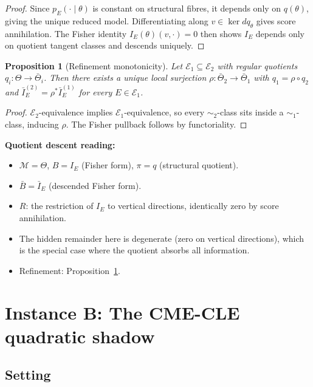 \documentclass[11pt,a4paper]{article}
\numberwithin{equation}{section}
\theoremstyle{thmcompact}
\newtheorem{proposition}[theorem]{Proposition}
\theoremstyle{remark}
\begin{document}
\begin{proof}
Since $p_E(\cdot \mid \theta)$ is constant on structural fibres, it depends only on $q(\theta)$, giving the unique reduced model. Differentiating along $v \in \ker dq_\theta$ gives score annihilation. The Fisher identity $I_E(\theta)(v, \cdot) = 0$ then shows $I_E$ depends only on quotient tangent classes and descends uniquely.
\end{proof}

\begin{proposition}[Refinement monotonicity]\label{prop:bridge-A-refine}
Let $\mathcal{E}_1 \subseteq \mathcal{E}_2$ with regular quotients $q_i: \Theta \to \bar{\Theta}_i$. Then there exists a unique local surjection $\rho: \bar{\Theta}_2 \to \bar{\Theta}_1$ with $q_1 = \rho \circ q_2$ and $\bar{I}_E^{(2)} = \rho^* \bar{I}_E^{(1)}$ for every $E \in \mathcal{E}_1$.
\end{proposition}

\begin{proof}
$\mathcal{E}_2$-equivalence implies $\mathcal{E}_1$-equivalence, so every $\sim_2$-class sits inside a $\sim_1$-class, inducing $\rho$. The Fisher pullback follows by functoriality.
\end{proof}

\textbf{Quotient descent reading:}
\begin{itemize}[leftmargin=2em]
\item $\mathcal{M} = \Theta$, $B = I_E$ (Fisher form), $\pi = q$ (structural quotient).
\item $\bar{B} = \bar{I}_E$ (descended Fisher form).
\item $R$: the restriction of $I_E$ to vertical directions, identically zero by score annihilation.
\item The hidden remainder here is degenerate (zero on vertical directions), which is the special case where the quotient absorbs all information.
\item Refinement: Proposition~\ref{prop:bridge-A-refine}.
\end{itemize}

\section{Instance B: The CME-CLE quadratic shadow}
\label{sec:bridge-B}

\subsection{Setting}
\end{document}
